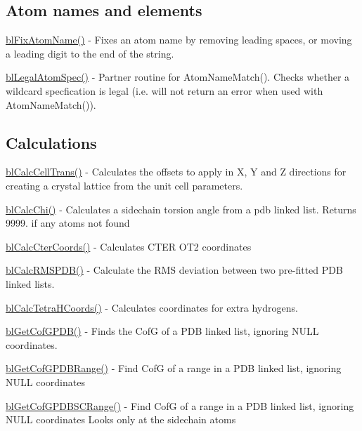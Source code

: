 \subsection*{Atom names and elements }


\begin{DoxyItemize}
\item \hyperlink{pdb_8h_a4beae504260cb072d1807d1e3aaa1982}{bl\-Fix\-Atom\-Name()} -\/ Fixes an atom name by removing leading spaces, or moving a leading digit to the end of the string.
\item \hyperlink{_legal_atom_spec_8c_ada6348597286455a167d0fb1e79310f4}{bl\-Legal\-Atom\-Spec()} -\/ Partner routine for Atom\-Name\-Match(). Checks whether a wildcard specfication is legal (i.\-e. will not return an error when used with Atom\-Name\-Match()).
\end{DoxyItemize}

\subsection*{Calculations }


\begin{DoxyItemize}
\item \hyperlink{_calc_cell_trans_8c_a96f7337e43ae22e9d8dddf64bfeb1171}{bl\-Calc\-Cell\-Trans()} -\/ Calculates the offsets to apply in X, Y and Z directions for creating a crystal lattice from the unit cell parameters.
\item \hyperlink{_calc_chi_p_d_b_8c_a48531e2570264f5426ebdee25154843c}{bl\-Calc\-Chi()} -\/ Calculates a sidechain torsion angle from a pdb linked list. Returns 9999. if any atoms not found
\item \hyperlink{_calc_cter_coords_8c_a01bc2dbda82c87a23615923cd34ef7f4}{bl\-Calc\-Cter\-Coords()} -\/ Calculates C\-T\-E\-R O\-T2 coordinates
\item \hyperlink{_calc_r_m_s_p_d_b_8c_a97af087139626cc883393fdfa81a25a8}{bl\-Calc\-R\-M\-S\-P\-D\-B()} -\/ Calculate the R\-M\-S deviation between two pre-\/fitted P\-D\-B linked lists.
\item \hyperlink{_calc_tetra_h_coords_8c_a2041d75d15d5eb5eaee7a3dcf4485b60}{bl\-Calc\-Tetra\-H\-Coords()} -\/ Calculates coordinates for extra hydrogens.
\item \hyperlink{_get_c_g_p_d_b_8c_a8044f4c9cc4e72b145b22fb6aa7cff96}{bl\-Get\-Cof\-G\-P\-D\-B()} -\/ Finds the Cof\-G of a P\-D\-B linked list, ignoring N\-U\-L\-L coordinates.
\item \hyperlink{_get_cof_g_p_d_b_range_8c_ad37a13c06cc7a2387d94d31aedaa70d6}{bl\-Get\-Cof\-G\-P\-D\-B\-Range()} -\/ Find Cof\-G of a range in a P\-D\-B linked list, ignoring N\-U\-L\-L coordinates
\item \hyperlink{_get_cof_g_p_d_b_s_c_range_8c_af87dc9da7f0178f35af4e70410da4a2b}{bl\-Get\-Cof\-G\-P\-D\-B\-S\-C\-Range()} -\/ Find Cof\-G of a range in a P\-D\-B linked list, ignoring N\-U\-L\-L coordinates Looks only at the sidechain atoms
\end{DoxyItemize}

